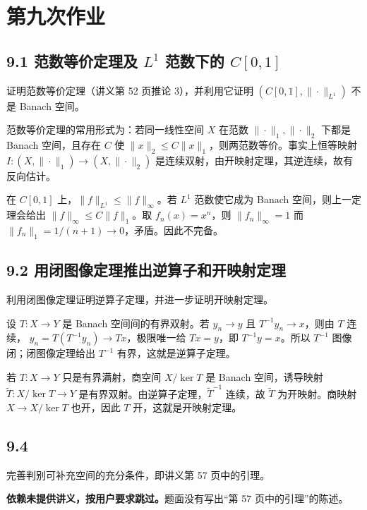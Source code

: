 \section{第九次作业}

\subsection*{9.1 范数等价定理及 $L^1$ 范数下的 $C[0,1]$}
\begin{problem}
证明范数等价定理（讲义第 52 页推论 3），并利用它证明
$(C[0,1],\|\cdot\|_{L^1})$ 不是 Banach 空间。
\end{problem}
范数等价定理的常用形式为：若同一线性空间 $X$ 在范数 $\|\cdot\|_1,\|\cdot\|_2$ 下都是 Banach 空间，且存在 $C$ 使
$\|x\|_2\le C\|x\|_1$，则两范数等价。事实上恒等映射
$I:(X,\|\cdot\|_1)\to(X,\|\cdot\|_2)$ 是连续双射，由开映射定理，其逆连续，故有反向估计。

在 $C[0,1]$ 上，$\|f\|_{L^1}\le\|f\|_\infty$。若 $L^1$ 范数使它成为 Banach 空间，则上一定理会给出 $\|f\|_\infty\le C\|f\|_1$。取 $f_n(x)=x^n$，则
$\|f_n\|_\infty=1$ 而 $\|f_n\|_1=1/(n+1)\to0$，矛盾。因此不完备。

\subsection*{9.2 用闭图像定理推出逆算子和开映射定理}
\begin{problem}
利用闭图像定理证明逆算子定理，并进一步证明开映射定理。
\end{problem}
设 $T:X\to Y$ 是 Banach 空间间的有界双射。若 $y_n\to y$ 且 $T^{-1}y_n\to x$，则由 $T$ 连续，
$y_n=T(T^{-1}y_n)\to Tx$，极限唯一给 $Tx=y$，即 $T^{-1}y=x$。所以 $T^{-1}$ 图像闭；闭图像定理给出 $T^{-1}$ 有界，这就是逆算子定理。

若 $T:X\to Y$ 只是有界满射，商空间 $X/\ker T$ 是 Banach 空间，诱导映射
$\widetilde T:X/\ker T\to Y$ 是有界双射。由逆算子定理，$\widetilde T^{-1}$ 连续，故 $\widetilde T$ 为开映射。商映射 $X\to X/\ker T$ 也开，因此 $T$ 开，这就是开映射定理。

\subsection*{9.4}
\begin{problem}
完善判别可补充空间的充分条件，即讲义第 57 页中的引理。
\end{problem}
\textbf{依赖未提供讲义，按用户要求跳过。}题面没有写出“第 57 页中的引理”的陈述。

